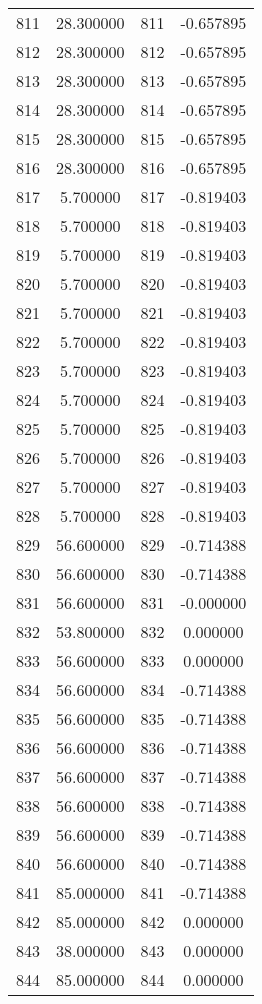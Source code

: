 \documentclass[12pt]{article}
\begin{document}
\begin{longtable}{@{}cccc@{}}
811 & 28.300000 & 811 & -0.657895 \\
812 & 28.300000 & 812 & -0.657895 \\
813 & 28.300000 & 813 & -0.657895 \\
814 & 28.300000 & 814 & -0.657895 \\
815 & 28.300000 & 815 & -0.657895 \\
816 & 28.300000 & 816 & -0.657895 \\
817 & 5.700000 & 817 & -0.819403 \\
818 & 5.700000 & 818 & -0.819403 \\
819 & 5.700000 & 819 & -0.819403 \\
820 & 5.700000 & 820 & -0.819403 \\
821 & 5.700000 & 821 & -0.819403 \\
822 & 5.700000 & 822 & -0.819403 \\
823 & 5.700000 & 823 & -0.819403 \\
824 & 5.700000 & 824 & -0.819403 \\
825 & 5.700000 & 825 & -0.819403 \\
826 & 5.700000 & 826 & -0.819403 \\
827 & 5.700000 & 827 & -0.819403 \\
828 & 5.700000 & 828 & -0.819403 \\
829 & 56.600000 & 829 & -0.714388 \\
830 & 56.600000 & 830 & -0.714388 \\
831 & 56.600000 & 831 & -0.000000 \\
832 & 53.800000 & 832 & 0.000000 \\
833 & 56.600000 & 833 & 0.000000 \\
834 & 56.600000 & 834 & -0.714388 \\
835 & 56.600000 & 835 & -0.714388 \\
836 & 56.600000 & 836 & -0.714388 \\
837 & 56.600000 & 837 & -0.714388 \\
838 & 56.600000 & 838 & -0.714388 \\
839 & 56.600000 & 839 & -0.714388 \\
840 & 56.600000 & 840 & -0.714388 \\
841 & 85.000000 & 841 & -0.714388 \\
842 & 85.000000 & 842 & 0.000000 \\
843 & 38.000000 & 843 & 0.000000 \\
844 & 85.000000 & 844 & 0.000000 \\

\end{longtable}
\end{document}

